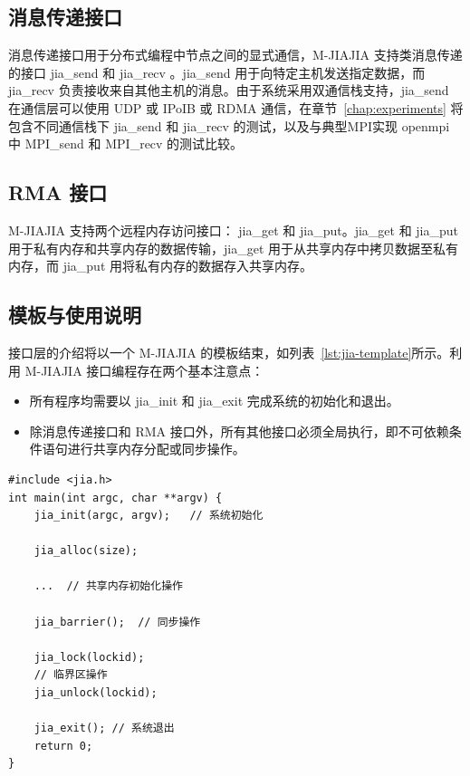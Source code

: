 {    \subsection{消息传递接口}
    消息传递接口用于分布式编程中节点之间的显式通信，M-JIAJIA 支持类消息传递的接口 jia\_send 和 jia\_recv 。jia\_send 用于向特定主机发送指定数据，而 jia\_recv 负责接收来自其他主机的消息。由于系统采用双通信栈支持，jia\_send 在通信层可以使用 UDP 或 IPoIB 或 RDMA 通信，在章节~\ref{chap:experiments} 将包含不同通信栈下 jia\_send 和 jia\_recv 的测试，以及与典型MPI实现 openmpi 中 MPI\_send 和 MPI\_recv 的测试比较。

    \subsection{RMA 接口}
    M-JIAJIA 支持两个远程内存访问接口： jia\_get 和 jia\_put。jia\_get 和 jia\_put 用于私有内存和共享内存的数据传输，jia\_get 用于从共享内存中拷贝数据至私有内存，而 jia\_put 用将私有内存的数据存入共享内存。
    \subsection{模板与使用说明}
    接口层的介绍将以一个 M-JIAJIA 的模板结束，如列表~\ref{lst:jia-template}所示。利用 M-JIAJIA 接口编程存在两个基本注意点：
    \begin{itemize}
        \item 所有程序均需要以 jia\_init 和 jia\_exit 完成系统的初始化和退出。
        \item 除消息传递接口和 RMA 接口外，所有其他接口必须全局执行，即不可依赖条件语句进行共享内存分配或同步操作。
    \end{itemize}
    \begin{lstlisting}[style=CStyle, caption={M-JIAJIA 应用模板}, label={lst:jia-template}]
#include <jia.h>
int main(int argc, char **argv) {
    jia_init(argc, argv);   // 系统初始化

    jia_alloc(size);
    
    ...  // 共享内存初始化操作

    jia_barrier();  // 同步操作    

    jia_lock(lockid);
    // 临界区操作
    jia_unlock(lockid);
    
    jia_exit(); // 系统退出
    return 0;
}
\end{lstlisting}
}
